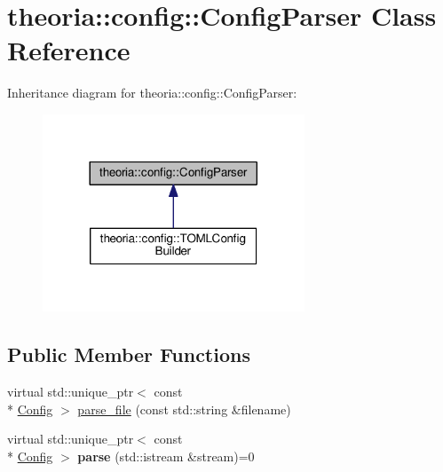 \hypertarget{classtheoria_1_1config_1_1ConfigParser}{\section{theoria\+:\+:config\+:\+:Config\+Parser Class Reference}
\label{classtheoria_1_1config_1_1ConfigParser}
}


Inheritance diagram for theoria\+:\+:config\+:\+:Config\+Parser\+:
\nopagebreak
\begin{figure}[H]
\begin{center}
\leavevmode
\includegraphics[width=221pt]{classtheoria_1_1config_1_1ConfigParser__inherit__graph}
\end{center}
\end{figure}
\subsection*{Public Member Functions}
\begin{DoxyCompactItemize}
\item 
virtual std\+::unique\+\_\+ptr$<$ const \\*
\hyperlink{classtheoria_1_1config_1_1Config}{Config} $>$ \hyperlink{classtheoria_1_1config_1_1ConfigParser_a4eca80a9831324237f2a2aa9a5018c89}{parse\+\_\+file} (const std\+::string \&filename)
\item 
\hypertarget{classtheoria_1_1config_1_1ConfigParser_af0ccd3cc2202c3d588a977c611dfa988}{virtual std\+::unique\+\_\+ptr$<$ const \\*
\hyperlink{classtheoria_1_1config_1_1Config}{Config} $>$ {\bfseries parse} (std\+::istream \&stream)=0}\label{classtheoria_1_1config_1_1ConfigParser_af0ccd3cc2202c3d588a977c611dfa988}

\end{DoxyCompactItemize}


